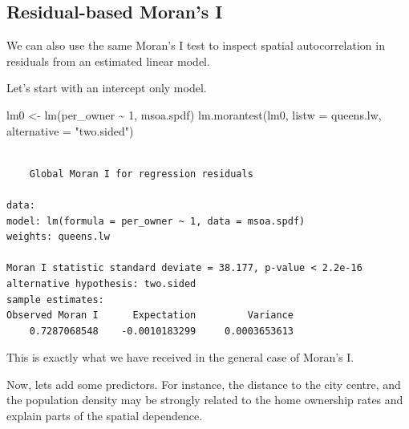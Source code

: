 \documentclass[
  letterpaper,
]{scrbook}
\newenvironment{Shaded}{\begin{snugshade}}{\end{snugshade}}
\newcommand{\AttributeTok}[1]{\textcolor[rgb]{0.40,0.45,0.13}{#1}}
\newcommand{\DecValTok}[1]{\textcolor[rgb]{0.68,0.00,0.00}{#1}}
\newcommand{\FunctionTok}[1]{\textcolor[rgb]{0.28,0.35,0.67}{#1}}
\newcommand{\NormalTok}[1]{\textcolor[rgb]{0.00,0.23,0.31}{#1}}
\newcommand{\OtherTok}[1]{\textcolor[rgb]{0.00,0.23,0.31}{#1}}
\newcommand{\SpecialCharTok}[1]{\textcolor[rgb]{0.37,0.37,0.37}{#1}}
\newcommand{\StringTok}[1]{\textcolor[rgb]{0.13,0.47,0.30}{#1}}
\begin{document}
\hypertarget{residual-based-morans-i}{%
\subsection{Residual-based Moran's I}\label{residual-based-morans-i}}

We can also use the same Moran's I test to inspect spatial
autocorrelation in residuals from an estimated linear model.

Let's start with an intercept only model.

\begin{Shaded}
\begin{Highlighting}[]
\NormalTok{lm0 }\OtherTok{\textless{}{-}} \FunctionTok{lm}\NormalTok{(per\_owner }\SpecialCharTok{\textasciitilde{}} \DecValTok{1}\NormalTok{, msoa.spdf)}
\FunctionTok{lm.morantest}\NormalTok{(lm0, }\AttributeTok{listw =}\NormalTok{ queens.lw, }\AttributeTok{alternative =} \StringTok{"two.sided"}\NormalTok{)}
\end{Highlighting}
\end{Shaded}

\begin{verbatim}

    Global Moran I for regression residuals

data:  
model: lm(formula = per_owner ~ 1, data = msoa.spdf)
weights: queens.lw

Moran I statistic standard deviate = 38.177, p-value < 2.2e-16
alternative hypothesis: two.sided
sample estimates:
Observed Moran I      Expectation         Variance 
    0.7287068548    -0.0010183299     0.0003653613 
\end{verbatim}

This is exactly what we have received in the general case of Moran's I.

Now, lets add some predictors. For instance, the distance to the city
centre, and the population density may be strongly related to the home
ownership rates and explain parts of the spatial dependence.
\end{document}
